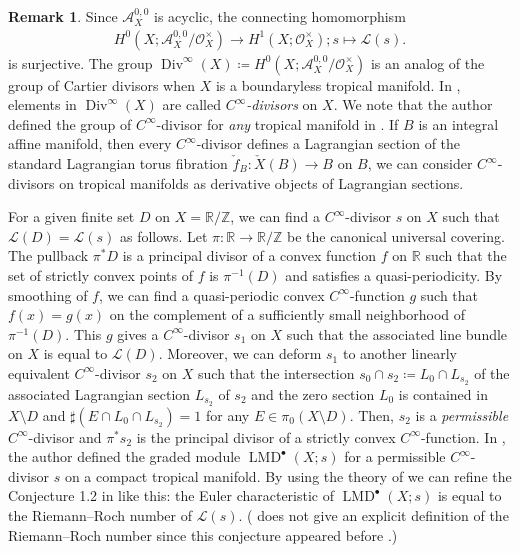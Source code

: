 \documentclass[a4paper,dvipdfmx,reqno,12pt]{amsart}
\theoremstyle{definition}
\newtheorem{remark}[theorem]{Remark}
\newcommand{\deq}{\coloneqq}
\newcommand{\opn}[1]{\operatorname{#1}}
\numberwithin{equation}{section}
\begin{document}
\begin{remark}
Since $\mathcal{A}^{0,0}_X$ is acyclic,
the connecting homomorphism
\begin{align}
H^{0}(X;\mathcal{A}^{0,0}_X/\mathcal{O}_X^{\times})
\to H^{1}(X;\mathcal{O}_X^{\times}); s\mapsto \mathcal{L}(s).
\end{align}
is surjective. The group 
$\opn{Div}^{\infty}(X)\deq 
H^{0}(X;\mathcal{A}^{0,0}_X/\mathcal{O}_X^{\times})$
is an analog of the group of Cartier divisors
when $X$ is a boundaryless tropical manifold.
In \cite{tsutsui2023graded}, elements 
in $\opn{Div}^{\infty}(X)$ are called 
\emph{$C^{\infty}$-divisors} on $X$.
We note that the author 
defined the group of $C^{\infty}$-divisor for \emph{any}
tropical manifold in \cite{tsutsui2023graded}.
If $B$ is an integral affine manifold,
then every $C^{\infty}$-divisor defines
a Lagrangian section of the standard Lagrangian
torus fibration $\check{f}_B\colon \check{X}(B)\to B$
on $B$, we can consider $C^{\infty}$-divisors on
tropical manifolds as derivative objects
of Lagrangian sections.

For a given finite set $D$ on
$X=\mathbb{R}/\mathbb{Z}$,
we can find a $C^{\infty}$-divisor $s$ on $X$
such that $\mathcal{L}(D)=\mathcal{L}(s)$ as follows.
Let $\pi\colon \mathbb{R}\to \mathbb{R}/\mathbb{Z}$
be the canonical universal covering.
The pullback $\pi^* D$ is a principal divisor 
of a convex function $f$ on $\mathbb{R}$ such that 
the set of strictly convex points of $f$ is $\pi^{-1}(D)$
and satisfies a quasi-periodicity.
By smoothing of $f$, we can find a quasi-periodic
convex $C^{\infty}$-function $g$ such that $f(x)=g(x)$ on 
the complement of a sufficiently 
small neighborhood of $\pi^{-1}(D)$. 
This $g$ gives a $C^{\infty}$-divisor $s_1$ on
$X$ such that the associated line bundle on $X$ is equal
to $\mathcal{L}(D)$.
Moreover, we can deform $s_1$ to another 
linearly equivalent 
$C^{\infty}$-divisor $s_2$ on $X$ such that 
the intersection $s_0\cap s_2\deq 
L_{0}\cap L_{s_2}$ of the associated 
Lagrangian section $L_{s_2}$
of $s_2$ and the zero section $L_0$ is contained in 
$X\setminus D$ and $\sharp (E\cap L_{0}\cap L_{s_2})=1$
for any $E\in \pi_0(X\setminus D)$.
Then, $s_2$ is a \emph{permissible} 
$C^{\infty}$-divisor and $\pi^{*}s_2$ is the 
principal divisor of a strictly convex
$C^{\infty}$-function. 
In \cite{tsutsui2023graded}, the author
defined the graded module $\opn{LMD}^{\bullet}(X;s)$
for a permissible $C^{\infty}$-divisor $s$ on
a compact tropical manifold.
By using the theory of \cite{demedrano2023chern}
we can refine the Conjecture 1.2 in 
\cite{tsutsui2023graded}
like this: the Euler characteristic of
$\opn{LMD}^{\bullet}(X;s)$ 
is equal to the Riemann--Roch number of 
$\mathcal{L}(s)$.
(\cite[Conjecture 1.2]{tsutsui2023graded} does not
give an explicit definition of the Riemann--Roch number
since this conjecture appeared before
\cite{demedrano2023chern}.)



\end{remark}
\end{document}
